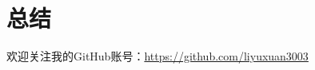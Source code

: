 \section{总结}

\begin{frame}
    \alert{欢迎关注我的GitHub账号}：\url{https://github.com/liyuxuan3003}
\end{frame}
